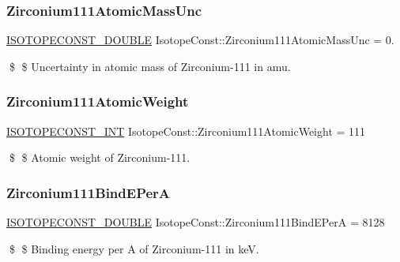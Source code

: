 \subsubsection{\texorpdfstring{Zirconium111\+Atomic\+Mass\+Unc}{Zirconium111AtomicMassUnc}}
{\footnotesize\ttfamily \mbox{\hyperlink{group___isotope_const-_macros_ga8f45a7272ce02c0b4c65c44636ed719a}{I\+S\+O\+T\+O\+P\+E\+C\+O\+N\+S\+T\+\_\+\+D\+O\+U\+B\+LE}} Isotope\+Const\+::\+Zirconium111\+Atomic\+Mass\+Unc = 0.}

\$ \$ Uncertainty in atomic mass of Zirconium-\/111 in amu. \mbox{\label{group___isotope_const-_zirconium-_zr111_ga1a243aba471a170582c1c010f34317e0}} 
\subsubsection{\texorpdfstring{Zirconium111\+Atomic\+Weight}{Zirconium111AtomicWeight}}
{\footnotesize\ttfamily \mbox{\hyperlink{group___isotope_const-_macros_ga5f18360b3e99483a35c32d789e62621c}{I\+S\+O\+T\+O\+P\+E\+C\+O\+N\+S\+T\+\_\+\+I\+NT}} Isotope\+Const\+::\+Zirconium111\+Atomic\+Weight = 111}

\$ \$ Atomic weight of Zirconium-\/111. \mbox{\label{group___isotope_const-_zirconium-_zr111_gaa2992ace0425505ca25d94c386809d1d}} 
\subsubsection{\texorpdfstring{Zirconium111\+Bind\+E\+PerA}{Zirconium111BindEPerA}}
{\footnotesize\ttfamily \mbox{\hyperlink{group___isotope_const-_macros_ga8f45a7272ce02c0b4c65c44636ed719a}{I\+S\+O\+T\+O\+P\+E\+C\+O\+N\+S\+T\+\_\+\+D\+O\+U\+B\+LE}} Isotope\+Const\+::\+Zirconium111\+Bind\+E\+PerA = 8128}

\$ \$ Binding energy per A of Zirconium-\/111 in keV. \mbox{\label{group___isotope_const-_zirconium-_zr111_ga9eea8a8ca59466338adb12a5a8f0078d}} 
